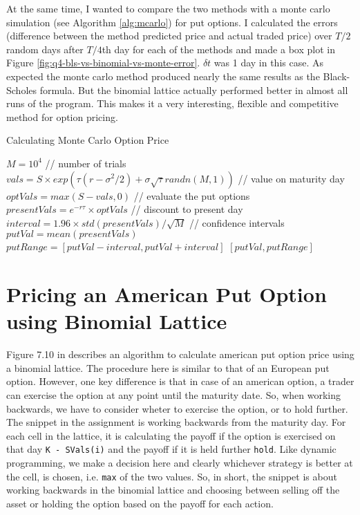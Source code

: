 \documentclass[11pt, fleqn]{article}
\let\oldReturn\Return
\renewcommand{\Return}{\State\oldReturn}
\begin{document}
At the same time, I wanted to compare the two methods with a monte carlo simulation (see Algorithm \ref{alg:mcarlo}) for put options. I calculated the errors (difference between the method predicted price and actual traded price) over $T/2$ random days after $T/4$th day for each of the methods and made a box plot in Figure \ref{fig:q4-bls-vs-binomial-vs-monte-error}. $\delta t$ was 1 day in this case. As expected the monte carlo method produced nearly the same results as the Black-Scholes formula. But the binomial lattice actually performed better in almost all runs of the program. This makes it a very interesting, flexible and competitive method for option pricing.

\begin{algorithm}[H]
\caption{Calculating Monte Carlo Option Price}
\label{alg:mcarlo}
\begin{algorithmic}
\State $M = 10^4$ // number of trials
\State $vals=S\times exp(\tau(r-\sigma^2/2) + \sigma\sqrt{\tau}randn(M,1))$ // value on maturity day
\State $optVals=max(S-vals,0)$ // evaluate the put options
\State $presentVals=e^{-r\tau}\times optVals$ // discount to present day
\State $interval=1.96\times std(presentVals)/\sqrt{M}$ // confidence intervals
\State $putVal=mean(presentVals)$
\State $putRange = [putVal-interval, putVal+interval]$
\Return $[putVal,putRange]$
\EndFunction
\end{algorithmic}
\end{algorithm}

\section{Pricing an American Put Option using Binomial Lattice}

Figure 7.10 in \cite{brandimarte} describes an algorithm to calculate american put option price using a binomial lattice. The procedure here is similar to that of an European put option. However, one key difference is that in case of an american option, a trader can exercise the option at any point until the maturity date. So, when working backwards, we have to consider wheter to exercise the option, or to hold further.\\

The snippet in the assignment is working backwards from the maturity day. For each cell in the lattice, it is calculating the payoff if the option is exercised on that day \texttt{K - SVals(i)} and the payoff if it is held further \texttt{hold}. Like dynamic programming, we make a decision here and clearly whichever strategy is better at the cell, is chosen, i.e. \texttt{max} of the two values. So, in short, the snippet is about working backwards in the binomial lattice and choosing between selling off the asset or holding the option based on the payoff for each action.\\
\end{document}
